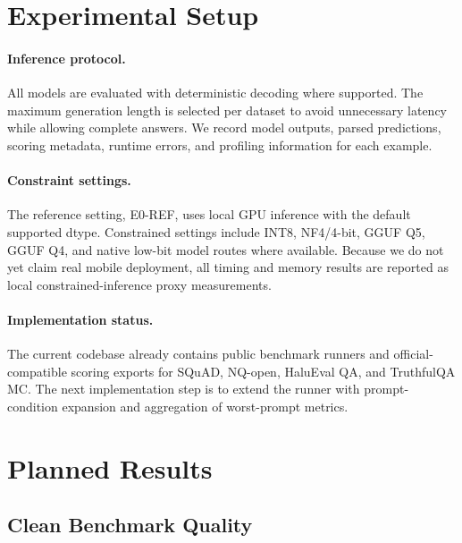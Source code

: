 \documentclass[letterpaper]{article}
\begin{document}
\section{Experimental Setup}

\paragraph{Inference protocol.}
All models are evaluated with deterministic decoding where supported. The maximum generation length is selected per dataset to avoid unnecessary latency while allowing complete answers. We record model outputs, parsed predictions, scoring metadata, runtime errors, and profiling information for each example.

\paragraph{Constraint settings.}
The reference setting, E0-REF, uses local GPU inference with the default supported dtype. Constrained settings include INT8, NF4/4-bit, GGUF Q5, GGUF Q4, and native low-bit model routes where available. Because we do not yet claim real mobile deployment, all timing and memory results are reported as local constrained-inference proxy measurements.

\paragraph{Implementation status.}
The current codebase already contains public benchmark runners and official-compatible scoring exports for SQuAD, NQ-open, HaluEval QA, and TruthfulQA MC. The next implementation step is to extend the runner with prompt-condition expansion and aggregation of worst-prompt metrics.

\section{Planned Results}

\subsection{Clean Benchmark Quality}
\end{document}
